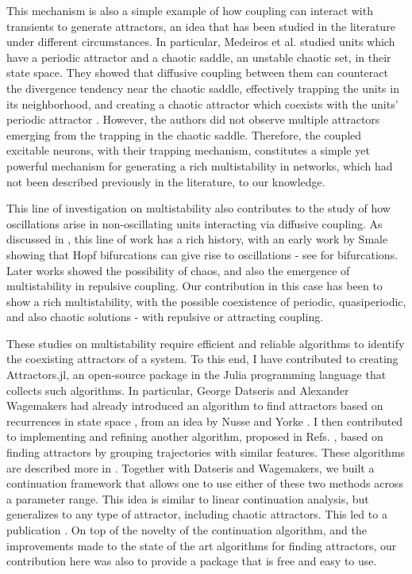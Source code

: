 This mechanism is also a simple example of how coupling can interact with transients to generate attractors, an idea that has been studied in the literature under different circumstances. In particular, Medeiros et al. studied units which have a periodic attractor and a chaotic saddle, an unstable chaotic set, in their state space. They showed that diffusive coupling between them can counteract the divergence tendency near the chaotic saddle, effectively trapping the units in its neighborhood, and creating a chaotic attractor which coexists with the units' periodic attractor \cite{medeiros2018boundaries, medeiros2019state}. However, the authors did not observe multiple attractors emerging from the trapping in the chaotic saddle. Therefore, the coupled excitable neurons, with their trapping mechanism, constitutes a simple yet powerful mechanism for generating a rich multistability in networks, which had not been described previously in the literature, to our knowledge.

This line of investigation on multistability also contributes to the study of how oscillations arise in non-oscillating units interacting via diffusive coupling. As discussed in , this line of work has a rich history, with an early work by Smale showing that Hopf bifurcations can give rise to oscillations \cite{smale1976a} - see  for bifurcations. Later works showed the possibility of chaos, and also the emergence of multistability in repulsive coupling. Our contribution in this case has been to show a rich multistability, with the possible coexistence of periodic, quasiperiodic, and also chaotic solutions - with repulsive or attracting coupling. 

These studies on multistability require efficient and reliable algorithms to identify the coexisting attractors of a system. To this end, I have contributed to creating Attractors.jl, an open-source package in the Julia programming language that collects such algorithms. In particular, George Datseris and Alexander Wagemakers had already introduced an algorithm to find attractors based on recurrences in state space \cite{datseris2022effortless}, from an idea by Nusse and Yorke \cite{nusse1994dynamics}. I then contributed to implementing and refining another algorithm, proposed in Refs. \cite{stender2021bstab, gelbrecht2020monte}, based on finding attractors by grouping trajectories with similar features. These algorithms are described more in . Together with Datseris and Wagemakers, we built a continuation framework that allows one to use either of these two methods across a parameter range. This idea is similar to linear continuation analysis, but generalizes to any type of attractor, including chaotic attractors. This led to a publication \cite{datseris2023framework}. On top of the novelty of the continuation algorithm, and the improvements made to the state of the art algorithms for finding attractors, our contribution here was also to provide a package that is free and easy to use. 

